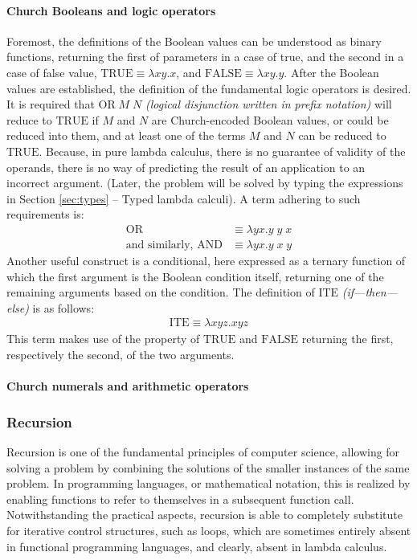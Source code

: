 \documentclass[table, a4paper, 10pt]{article}
\begin{document}
\paragraph{Church Booleans and logic operators}
Foremost, the definitions of the Boolean values can be understood as binary functions, returning
the first of parameters in a case of true, and the second in a case
of false value,
$\mathrm{TRUE} \equiv \lambda xy.x$, and $\mathrm{FALSE} \equiv \lambda xy.y$.
After the Boolean values are established, the definition of the fundamental
logic operators is desired. It is required that $\mathrm{OR}\;M\;N$ 
\textit{(logical disjunction written in prefix notation)} will
reduce to $\mathrm{TRUE}$ if $M$ and $N$ are Church-encoded Boolean values,
or could be reduced into them,
and at least one of the terms $M$ and $N$ can be reduced to $\mathrm{TRUE}$.
Because, in pure lambda calculus, there is no guarantee of validity of
the operands, there is no way of predicting the result of an application to
an incorrect argument. (Later, the problem will be solved by typing
the expressions in Section \ref{sec:types} -- Typed lambda calculi). A term adhering to
such requirements is:
\begin{align*}
	\mathrm{OR} &\equiv \lambda y x. y\;y\;x\\
	\text{and similarly, }\mathrm{AND} &\equiv \lambda y x. y\;x\;y
\end{align*}
Another useful construct is a conditional, here expressed as a ternary function
of which the first argument is the Boolean condition itself, returning one
of the remaining arguments based on the condition. The definition of
$\mathrm{ITE}$ \textit{(if---then---else)} is as follows:
\begin{align*}
	\mathrm{ITE} \equiv \lambda xyz.xyz
\end{align*}
This term makes use of the property of $\mathrm{TRUE}$ and $\mathrm{FALSE}$
returning the first, respectively the second, of the two arguments.

\paragraph{Church numerals and arithmetic operators} \label{ChurchNumerals}

\subsubsection{Recursion}
Recursion is one of the fundamental principles of computer science,
allowing for solving a problem by combining the solutions
of the smaller instances of the same problem. In programming languages,
or mathematical notation, this is realized by enabling functions
to refer to themselves in a subsequent function call. Notwithstanding
the practical aspects, recursion is able to completely substitute
for iterative control structures, such as loops,
which are sometimes entirely absent in functional programming languages, and clearly,
absent in lambda calculus.
\end{document}
